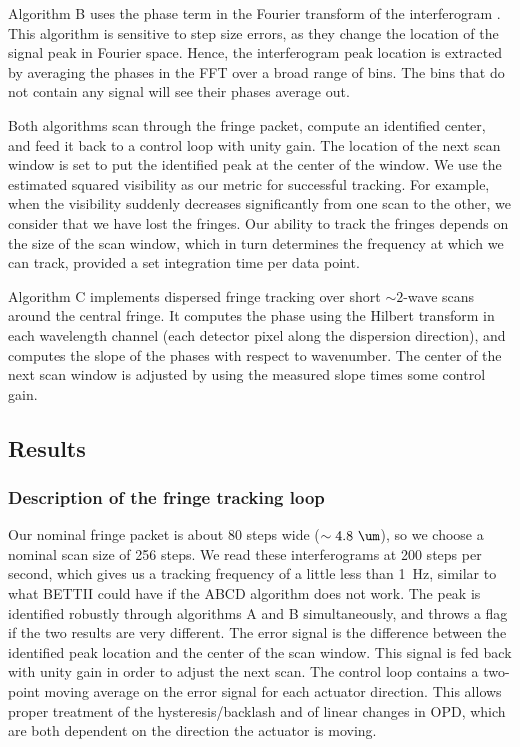 Algorithm B uses the phase term in the Fourier transform of the interferogram \citep{Pedretti:2004ti}. This algorithm is sensitive to step size errors, as they change the location of the signal peak in Fourier space. Hence, the interferogram peak location is extracted by averaging the phases in the FFT over a broad range of bins. The bins that do not contain any signal will see their phases average out.

Both algorithms scan through the fringe packet, compute an identified center, and feed it back to a control loop with unity gain. The location of the next scan window is set to put the identified peak at the center of the window. We use the estimated squared visibility as our metric for successful tracking. For example, when the visibility suddenly decreases significantly from one scan to the other, we consider that we have lost the fringes. Our ability to track the fringes depends on the size of the scan window, which in turn determines the frequency at which we can track, provided a set integration time per data point.

Algorithm C implements dispersed fringe tracking over short $\sim 2$-wave scans around the central fringe. It computes the phase using the Hilbert transform in each wavelength channel (each detector pixel along the dispersion direction), and computes the slope of the phases with respect to wavenumber. The center of the next scan window is adjusted by using the measured slope times some control gain.

\subsection{Results}

\subsubsection{Description of the fringe tracking loop}
Our nominal fringe packet is about 80 steps wide ($\sim 4.8~\um$), so we choose a nominal scan size of 256 steps. We read these interferograms at 200 steps per second, which gives us a tracking frequency of a little less than 1~Hz, similar to what BETTII could have if the ABCD algorithm does not work. The peak is identified robustly through algorithms A and B simultaneously, and throws a flag if the two results are very different. The error signal is the difference between the identified peak location and the center of the scan window. This signal is fed back with unity gain in order to adjust the next scan. The control loop contains a two-point moving average on the error signal for each actuator direction. This allows proper treatment of the hysteresis/backlash and of linear changes in OPD, which are both dependent on the direction the actuator is moving.

